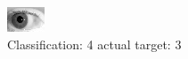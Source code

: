 \begin{figure}[h!]
\begin{center}
\includegraphics[width=0.60\columnwidth]{figures/ID184_class_4_target_3.png}
\end{center}
\caption{ Classification: 4 actual target: 3}
\label{fig:ID184_class_4_target_3}
\end{figure}
